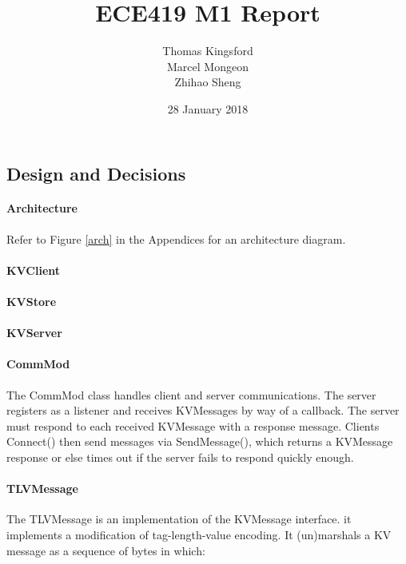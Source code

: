 \documentclass[12pt]{article}
\title{ECE419 M1 Report}
\date{28 January 2018}
\author{Thomas Kingsford\\Marcel Mongeon\\Zhihao Sheng}
\begin{document}
\begin{multicols}{2}
\maketitle

\section{Design and Decisions}

\paragraph{Architecture} Refer to Figure \ref{arch} in the Appendices for an architecture diagram.

\paragraph{KVClient} 

\paragraph{KVStore}

\paragraph{KVServer}

\paragraph{CommMod} The CommMod class handles client and server communications. The server registers as a listener and receives KVMessages by way of a callback. The server must respond to each received KVMessage with a response message. Clients Connect() then send messages via SendMessage(), which returns a KVMessage response or else times out if the server fails to respond quickly enough.

\paragraph{TLVMessage} The TLVMessage is an implementation of the KVMessage interface. it implements a modification of tag-length-value encoding. It (un)marshals a KV message as a sequence of bytes in which:


\end{multicols}
\end{document}
